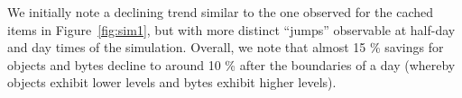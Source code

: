 \documentclass[letterpaper,conference]{IEEEtran}
\begin{document}
We initially note a declining trend similar to the one observed for the cached items in Figure~\ref{fig:sim1}, but with more distinct ``jumps'' observable at half-day and day times of the simulation.
Overall, we note that almost 15 \% savings for objects and bytes decline to around 10 \% after the boundaries of a day (whereby objects exhibit lower levels and bytes exhibit higher levels).


%
\end{document}
